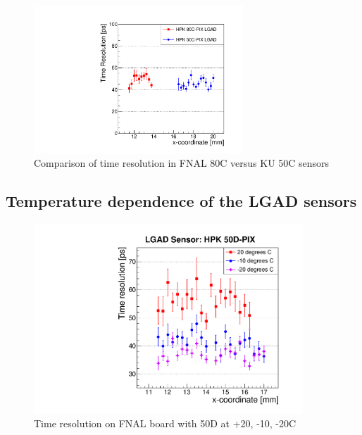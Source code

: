 \documentclass[preprint,1p]{elsarticle}
\begin{document}
\begin{figure}[htbp] 
\centering
\includegraphics[width=0.7\textwidth]{figs/FNAL_TimeResolution_vs_X_HPK50CVs80C.pdf} 
\caption{Comparison of time resolution in FNAL 80C versus KU 50C sensors } 
\label{fig:Sensors} 
\end{figure} 


\subsection{Temperature dependence of the LGAD sensors}

\begin{figure}[htbp] 
\centering
\includegraphics[width=0.9\textwidth]{figs/FNAL_TimeResolution_vs_X_HPK50D_TemperatureDependance.pdf} 
\caption{Time resolution on FNAL board with 50D at +20, -10, -20C} 
\label{fig:Sensors} 
\end{figure} 
\end{document}
